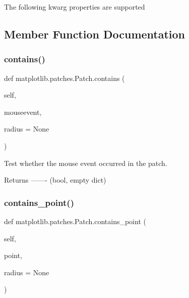 \begin{DoxyVerb}The following kwarg properties are supported

\end{DoxyVerb}
 

\subsection{Member Function Documentation}
\mbox{\label{classmatplotlib_1_1patches_1_1Patch_a5c8af9644e5f7de78e3ac5815f269dbd}} 
\subsubsection{\texorpdfstring{contains()}{contains()}}
{\footnotesize\ttfamily def matplotlib.\+patches.\+Patch.\+contains (\begin{DoxyParamCaption}\item[{}]{self,  }\item[{}]{mouseevent,  }\item[{}]{radius = {\ttfamily None} }\end{DoxyParamCaption})}

\begin{DoxyVerb}Test whether the mouse event occurred in the patch.

Returns
-------
(bool, empty dict)
\end{DoxyVerb}
 \mbox{\label{classmatplotlib_1_1patches_1_1Patch_a71fcaf2b147c2bdcea177c89251d533a}} 
\subsubsection{\texorpdfstring{contains\+\_\+point()}{contains\_point()}}
{\footnotesize\ttfamily def matplotlib.\+patches.\+Patch.\+contains\+\_\+point (\begin{DoxyParamCaption}\item[{}]{self,  }\item[{}]{point,  }\item[{}]{radius = {\ttfamily None} }\end{DoxyParamCaption})}

